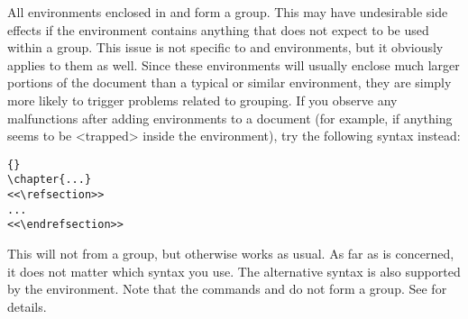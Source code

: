 All \latex environments enclosed in  and  form a group. This may have undesirable side effects if the environment contains anything that does not expect to be used within a group. This issue is not specific to  and  environments, but it obviously applies to them as well. Since these environments will usually enclose much larger portions of the document than a typical  or similar environment, they are simply more likely to trigger problems related to grouping. If you observe any malfunctions after adding  environments to a document (for example, if anything seems to be <trapped> inside the environment), try the following syntax instead:

\begin{lstlisting}[style=latex]{}
\chapter{...}
<<\refsection>>
...
<<\endrefsection>>
\end{lstlisting}
%
This will not from a group, but otherwise works as usual. As far as \biblatex is concerned, it does not matter which syntax you use. The alternative syntax is also supported by the  environment. Note that the commands  and  do not form a group. See  for details.
